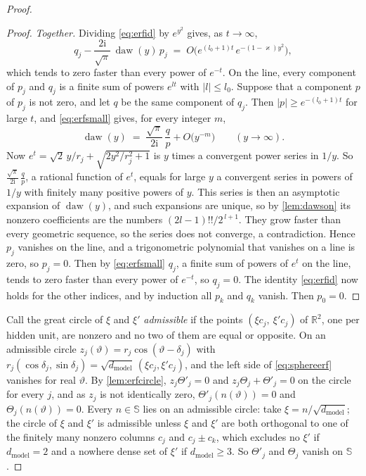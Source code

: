 \documentclass[10pt]{article}
\theoremstyle{definition}
\theoremstyle{remark}
\newcommand{\R}{\mathbb{R}}
\newcommand{\dm}{d_{\mathrm{model}}}
\newenvironment{nested}{\par\nopagebreak\def\FrameCommand{\hspace{0.5em}{\color{black!30}\vrule width 0.6pt}\hspace{1em}}\MakeFramed{\advance\hsize-\width\FrameRestore}}{\endMakeFramed}
\begin{document}
\begin{proof}
\begin{nested}
\begin{proof}
\emph{Together.} Dividing \eqref{eq:erfid} by $e^{y^2}$ gives, as $t \to \infty$,
\begin{equation}\label{eq:erfsmall}
q_j - \frac{2\mathrm i}{\sqrt\pi}\,\operatorname{daw}(y)\,p_j \;=\; O\big(e^{(l_0+1)t}\,e^{-(1-\varkappa)y^2}\big),
\end{equation}
which tends to zero faster than every power of $e^{-t}$. On the line, every component of $p_j$ and $q_j$ is a finite sum of powers $e^{lt}$ with $\lvert l\rvert \le l_0$. Suppose that a component $p$ of $p_j$ is not zero, and let $q$ be the same component of $q_j$. Then $\lvert p\rvert \ge e^{-(l_0+1)t}$ for large $t$, and \eqref{eq:erfsmall} gives, for every integer $m$,
\[
\operatorname{daw}(y) \;=\; \frac{\sqrt\pi}{2\mathrm i}\,\frac{q}{p} + O\big(y^{-m}\big) \qquad (y \to \infty).
\]
Now $e^{t} = \sqrt2\,y/r_j + \sqrt{2y^2/r_j^2 + 1}$ is $y$ times a convergent power series in $1/y$. So $\tfrac{\sqrt\pi}{2\mathrm i}\,\tfrac{q}{p}$, a rational function of $e^{t}$, equals for large $y$ a convergent series in powers of $1/y$ with finitely many positive powers of $y$. This series is then an asymptotic expansion of $\operatorname{daw}(y)$, and such expansions are unique, so by \cref{lem:dawson} its nonzero coefficients are the numbers $(2l-1)!!/2^{\,l+1}$. They grow faster than every geometric sequence, so the series does not converge, a contradiction. Hence $p_j$ vanishes on the line, and a trigonometric polynomial that vanishes on a line is zero, so $p_j = 0$. Then by \eqref{eq:erfsmall} $q_j$, a finite sum of powers of $e^{t}$ on the line, tends to zero faster than every power of $e^{-t}$, so $q_j = 0$. The identity \eqref{eq:erfid} now holds for the other indices, and by induction all $p_k$ and $q_k$ vanish. Then $p_0 = 0$.
\end{proof}
\end{nested}
Call the great circle of $\xi$ and $\xi'$ \emph{admissible} if the points $(\xi c_j,\ \xi'c_j)$ of $\R^2$, one per hidden unit, are nonzero and no two of them are equal or opposite. On an admissible circle $z_j(\vartheta) = r_j\cos(\vartheta - \delta_j)$ with $r_j(\cos\delta_j, \sin\delta_j) = \sqrt{\dm}\,(\xi c_j, \xi'c_j)$, and the left side of \eqref{eq:sphereerf} vanishes for real $\vartheta$. By \cref{lem:erfcircle}, $z_j\Theta'_j = 0$ and $z_j\Theta_j + \Theta'_j = 0$ on the circle for every $j$, and as $z_j$ is not identically zero, $\Theta'_j(n(\vartheta)) = 0$ and $\Theta_j(n(\vartheta)) = 0$. Every $n \in \mathbb S$ lies on an admissible circle: take $\xi = n/\sqrt{\dm}$; the circle of $\xi$ and $\xi'$ is admissible unless $\xi$ and $\xi'$ are both orthogonal to one of the finitely many nonzero columns $c_j$ and $c_j \pm c_k$, which excludes no $\xi'$ if $\dm = 2$ and a nowhere dense set of $\xi'$ if $\dm \ge 3$. So $\Theta'_j$ and $\Theta_j$ vanish on $\mathbb S$.


\end{proof}
\end{document}
